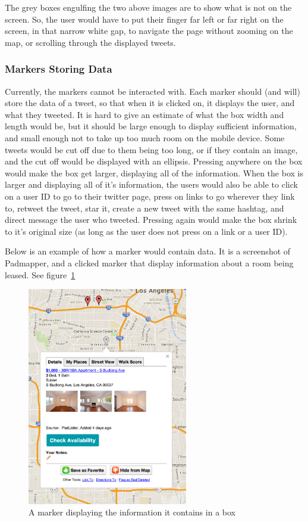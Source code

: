 \documentclass[11pt]{article}
\begin{document}
The grey boxes engulfing the two above images are to show what is not on the screen. So, the user would have to put their finger far left or far right on the screen, in that narrow white gap, to navigate the page without zooming on the map, or scrolling through the displayed tweets.

\subsubsection{Markers Storing Data}
Currently, the markers cannot be interacted with. Each marker should (and will) store the data of a tweet, so that when it is clicked on, it displays the user, and what they tweeted. It is hard to give an estimate of what the box width and length would be, but it should be large enough to display sufficient information, and small enough not to take up too much room on the mobile device. Some tweets would be cut off due to them being too long, or if they contain an image, and the cut off would be displayed with an ellipsis. Pressing anywhere on the box would make the box get larger, displaying all of the information. When the box is larger and displaying all of it's information, the users would also be able to click on a user ID to go to their twitter page, press on links to go wherever they link to, retweet the tweet, star it, create a new tweet with the same hashtag, and direct message the user who tweeted. Pressing again would make the box shrink to it's original size (as long as the user does not press on a link or a user ID).

Below is an example of how a marker would contain data. It is a screenshot of Padmapper, and a clicked marker that display information about a room being leased. See figure~\ref{fig:markerDisplay}

\begin{figure}[H]
    \centering
    \includegraphics[width=7cm]{markerBox}
    \caption{A marker displaying the information it contains in a box}
    \label{fig:markerDisplay}                
\end{figure}
\end{document}
